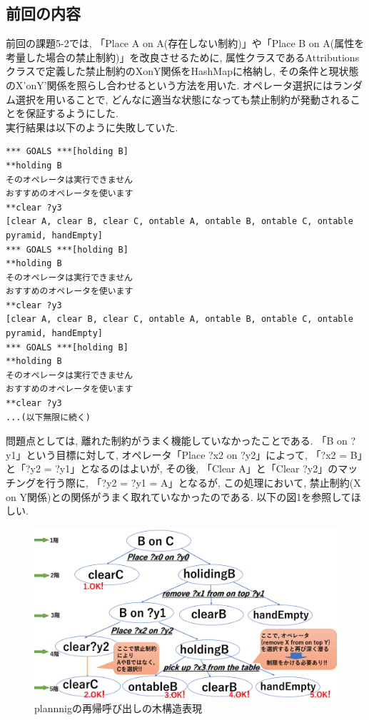 \documentclass[uplatex,12pt]{jsarticle}
\begin{document}
\subsection{前回の内容}
前回の課題5-2では, 「Place A on A(存在しない制約)」や「Place B on A(属性を考量した場合の禁止制約)」を改良させるために, 属性クラスであるAttributionsクラスで定義した禁止制約のXonY関係をHashMapに格納し, その条件と現状態のX'onY'関係を照らし合わせるという方法を用いた. オペレータ選択にはランダム選択を用いることで, どんなに適当な状態になっても禁止制約が発動されることを保証するようにした. \\

実行結果は以下のように失敗していた.
\begin{lstlisting}[caption=失敗実行例その1, label=src:No1]
*** GOALS ***[holding B]
**holding B
そのオペレータは実行できません
おすすめのオペレータを使います
**clear ?y3
[clear A, clear B, clear C, ontable A, ontable B, ontable C, ontable pyramid, handEmpty]
*** GOALS ***[holding B]
**holding B
そのオペレータは実行できません
おすすめのオペレータを使います
**clear ?y3
[clear A, clear B, clear C, ontable A, ontable B, ontable C, ontable pyramid, handEmpty]
*** GOALS ***[holding B]
**holding B
そのオペレータは実行できません
おすすめのオペレータを使います
**clear ?y3
...(以下無限に続く)
\end{lstlisting}

問題点としては, 離れた制約がうまく機能していなかったことである. 「B on ?y1」という目標に対して, オペレータ「Place ?x2 on ?y2」によって, 「?x2 = B」と「?y2 = ?y1」となるのはよいが, その後, 「Clear A」と「Clear ?y2」のマッチングを行う際に, 「?y2 = ?y1 = A」となるが, この処理において, 禁止制約(X on Y関係)との関係がうまく取れていなかったのである. 以下の図1を参照してほしい.

\begin{figure}[htbp]
 \begin{center}
  \includegraphics[width = 12cm, pagebox = cropbox, clip]{images/treeContsraction.pdf}
 \end{center}
 \caption[]{plannnigの再帰呼び出しの木構造表現}\label{fig:fig1.1}
\end{figure}
\end{document}
